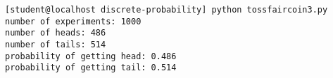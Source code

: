 {\footnotesize \begin{Verbatim}[frame=single,fontsize=\small]
[student@localhost discrete-probability] python tossfaircoin3.py
number of experiments: 1000
number of heads: 486
number of tails: 514
probability of getting head: 0.486
probability of getting tail: 0.514
\end{Verbatim}
 }
